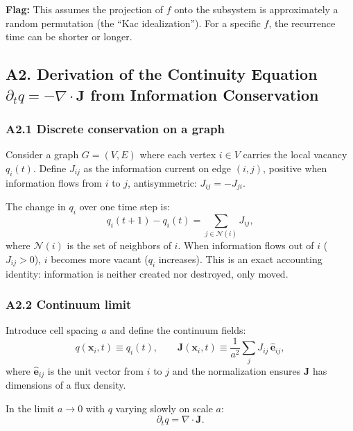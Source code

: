 \documentclass[reprint]{revtex4-2}
\begin{document}
\textbf{Flag:} This assumes the projection of $f$ onto the subsystem is approximately a random permutation (the ``Kac idealization''). For a specific $f$, the recurrence time can be shorter or longer.

\subsection{A2. Derivation of the Continuity Equation $\partial_t q = -\nabla\cdot\mathbf{J}$ from Information Conservation}

\subsubsection{A2.1 Discrete conservation on a graph}

Consider a graph $G=(V,E)$ where each vertex $i\in V$ carries the local vacancy $q_i(t)$. Define $J_{ij}$ as the information current on edge $(i,j)$, positive when information flows from $i$ to $j$, antisymmetric: $J_{ij} = -J_{ji}$.

The change in $q_i$ over one time step is:
\begin{equation}
q_i(t+1) - q_i(t) = \sum_{j\in\mathcal{N}(i)} J_{ij},
\label{eq:discrete_continuity}
\end{equation}
where $\mathcal{N}(i)$ is the set of neighbors of $i$. When information flows out of $i$ ($J_{ij}>0$), $i$ becomes more vacant ($q_i$ increases). This is an exact accounting identity: information is neither created nor destroyed, only moved.

\subsubsection{A2.2 Continuum limit}

Introduce cell spacing $a$ and define the continuum fields:
\begin{equation}
q(\mathbf{x}_i, t) \equiv q_i(t), \qquad \mathbf{J}(\mathbf{x}_i, t) \equiv \frac{1}{a^{2}}\sum_{j} J_{ij}\,\hat{\mathbf{e}}_{ij},
\end{equation}
where $\hat{\mathbf{e}}_{ij}$ is the unit vector from $i$ to $j$ and the normalization ensures $\mathbf{J}$ has dimensions of a flux density.

In the limit $a\to 0$ with $q$ varying slowly on scale $a$:
\begin{equation}
\boxed{\partial_t q = \nabla\cdot\mathbf{J}}.
\label{eq:continuity_continuum}
\end{equation}
\end{document}

